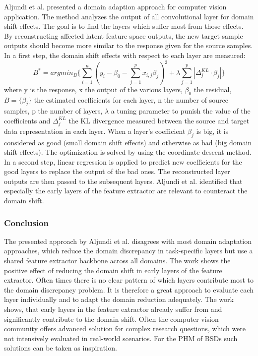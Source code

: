 Aljundi et al. \cite{Aljundi2016} presented a domain adaption approach for computer vision application. The method analyzes the output of all convolutional layer for domain shift effects. The goal is to find the layers which suffer most from those effects. By reconstructing affected latent feature space outputs, the new target sample outputs should become more similar to the response given for the source samples. In a first step, the domain shift effects with respect to each layer are measured:
\begin{equation}
    B^{*} = argmin_{B} \{ \sum_{i=1}^{n}( y_{i}-\beta_{0}-\sum_{j=1}^{p}x_{i,j}\beta_{j})^{2} + \lambda \sum_{j=1}^{p}|\Delta_{j}^{KL}\cdot \beta_{j}| \}
\end{equation}
where y is the response, x the output of the various layers, $\beta_{0}$ the residual, $B = \{\beta_{j}\}$ the estimated coefficients for each layer, n the number of
source samples, p the number of layers, $\lambda$ a tuning parameter to punish the value of the coefficients and $\Delta_{j}^{KL}$ the KL divergence measured between the source and target data representation in each layer. When a layer's coefficient  $\beta_{j}$ is big, it is considered as good (small domain shift effects) and otherwise as bad (big domain shift effects). The optimization is solved by using the coordinate descent method. In a second step, linear regression is applied to predict new coefficients for the good layers to replace the output of the bad ones. The reconstructed layer outputs are then passed to the subsequent layers. Aljundi et al. \cite{Aljundi2016} identified that especially the early layers of the feature extractor are relevant to counteract the domain shift.

\subsubsection{Conclusion}
The presented approach by Aljundi et al. \cite{Aljundi2016} disagrees with most domain adaptation approaches, which reduce the domain discrepancy in task-specific layers but use a shared feature extractor backbone across all domains. The work shows the positive effect of reducing the domain shift in early layers of the feature extractor. Often times there is no clear pattern of which layers contribute most to the domain discrepancy problem. It is therefore a great approach to evaluate each layer individually and to adapt the domain reduction adequately. The work shows, that early layers in the feature extractor already suffer from and significantly contribute to the domain shift. Often the computer vision community offers advanced solution for complex research questions, which were not intensively evaluated in real-world scenarios. For the PHM of BSDs such solutions can be taken as inspiration. 

